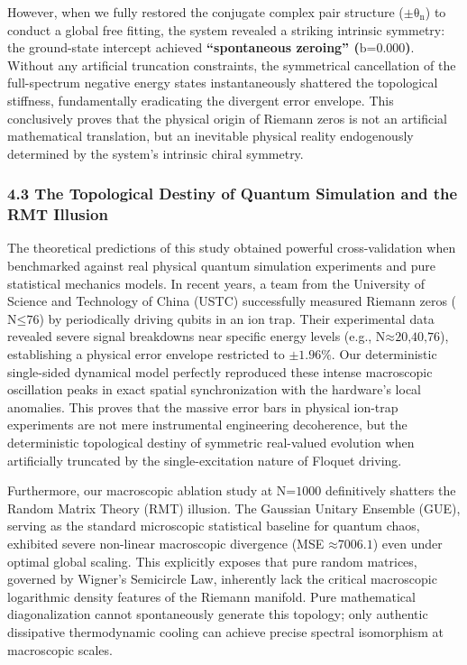 However, when we fully restored the conjugate complex pair structure
(\(\text{±}\text{θ}_{\text{n}}\)) to conduct a global free fitting, the
system revealed a striking intrinsic symmetry: the ground-state
intercept achieved \textbf{``spontaneous zeroing''
(}\(\text{b}\text{=0.000}\)\textbf{)}. Without any artificial truncation
constraints, the symmetrical cancellation of the full-spectrum negative
energy states instantaneously shattered the topological stiffness,
fundamentally eradicating the divergent error envelope. This
conclusively proves that the physical origin of Riemann zeros is not an
artificial mathematical translation, but an inevitable physical reality
endogenously determined by the system's intrinsic chiral symmetry.

\hypertarget{the-topological-destiny-of-quantum-simulation-and-the-rmt-illusion}{%
\subsubsection{\texorpdfstring{\textbf{4.3 The Topological Destiny of
Quantum Simulation and the RMT
Illusion}}{4.3 The Topological Destiny of Quantum Simulation and the RMT Illusion}}\label{the-topological-destiny-of-quantum-simulation-and-the-rmt-illusion}}

The theoretical predictions of this study obtained powerful
cross-validation when benchmarked against real physical quantum
simulation experiments and pure statistical mechanics models. In recent
years, a team from the University of Science and Technology of China
(USTC) successfully measured Riemann zeros (\(\text{N}\text{≤76}\)) by
periodically driving qubits in an ion trap. Their experimental data
revealed severe signal breakdowns near specific energy levels (e.g.,
\(\text{N}\text{≈20,40,76}\)), establishing a physical error envelope
restricted to \(\text{±1.96\%}\). Our deterministic single-sided
dynamical model perfectly reproduced these intense macroscopic
oscillation peaks in exact spatial synchronization with the hardware's
local anomalies. This proves that the massive error bars in physical
ion-trap experiments are not mere instrumental engineering decoherence,
but the deterministic topological destiny of symmetric real-valued
evolution when artificially truncated by the single-excitation nature of
Floquet driving.

Furthermore, our macroscopic ablation study at \(\text{N}\text{=1000}\)
definitively shatters the Random Matrix Theory (RMT) illusion. The
Gaussian Unitary Ensemble (GUE), serving as the standard microscopic
statistical baseline for quantum chaos, exhibited severe non-linear
macroscopic divergence (MSE \(\text{≈7006.1}\)) even under optimal
global scaling. This explicitly exposes that pure random matrices,
governed by Wigner's Semicircle Law, inherently lack the critical
macroscopic logarithmic density features of the Riemann manifold. Pure
mathematical diagonalization cannot spontaneously generate this
topology; only authentic dissipative thermodynamic cooling can achieve
precise spectral isomorphism at macroscopic scales.

